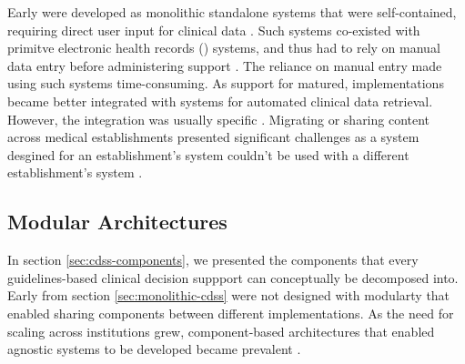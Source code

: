 Early \CDSSs{} were developed as monolithic standalone systems
that were self-contained, requiring direct user input for clinical data
\cite{RodriguezBook16}. Such systems co-existed with
primitve electronic health records (\EHR{}) systems,
and thus had to rely on manual data entry before administering support
\cite{ShortliffeBook12,BarnettJAMA87}. The reliance on manual entry
made using such systems time-consuming. As support for \EHR{} matured,
\CDSSs{} implementations became better integrated with \EHR{} systems
for automated clinical data retrieval. However,
the integration was usually \EHR{} specific \cite{RodriguezBook16}.
Migrating or sharing \CDSS{} content across medical establishments
presented significant challenges as a system desgined
for an establishment's \EHR{} system couldn't be used with a different
establishment's \EHR{} system \cite{KawamotoJBI10}.

\subsection{Modular \CDSS{} Architectures}

In section \ref{sec:cdss-components}, we presented the components that
every guidelines-based clinical decision suppport can conceptually be decomposed
into. Early \CDSSs{} from section \ref{sec:monolithic-cdss}
were not designed with modularty that enabled sharing components
between different implementations. As the need for scaling \CDSSs{}
across institutions grew, component-based architectures that
enabled \EHR{} agnostic systems to be developed became prevalent
\cite{KawamotoJBI10}.




